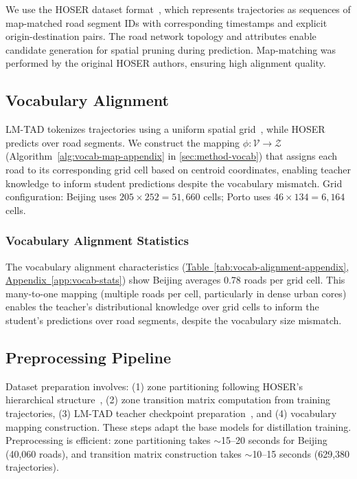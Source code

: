 We use the HOSER dataset format~\cite{caoHolisticSemanticRepresentation2025}, which represents trajectories as sequences of map-matched road segment IDs with corresponding timestamps and explicit origin-destination pairs. The road network topology and attributes enable candidate generation for spatial pruning during prediction. Map-matching was performed by the original HOSER authors, ensuring high alignment quality.

\subsection{Vocabulary Alignment}
\label{sec:data-lmtad-compat}

LM-TAD tokenizes trajectories using a uniform spatial grid~\cite{mbuyaTrajectoryAnomalyDetection2024}, while HOSER predicts over road segments. We construct the mapping $\phi: \mathcal{V} \rightarrow \mathcal{Z}$ (Algorithm~\ref{alg:vocab-map-appendix} in \autoref{sec:method-vocab}) that assigns each road to its corresponding grid cell based on centroid coordinates, enabling teacher knowledge to inform student predictions despite the vocabulary mismatch. Grid configuration: Beijing uses $205 \times 252 = 51{,}660$ cells; Porto uses $46 \times 134 = 6{,}164$ cells.

\subsubsection{Vocabulary Alignment Statistics}

The vocabulary alignment characteristics (\hyperref[app:vocab-stats]{Table~\ref*{tab:vocab-alignment-appendix}, Appendix~\ref*{app:vocab-stats}}) show Beijing averages 0.78 roads per grid cell. This many-to-one mapping (multiple roads per cell, particularly in dense urban cores) enables the teacher's distributional knowledge over grid cells to inform the student's predictions over road segments, despite the vocabulary size mismatch.

\subsection{Preprocessing Pipeline}
\label{sec:data-pipeline}

Dataset preparation involves: (1) zone partitioning following HOSER's hierarchical structure~\cite{caoHolisticSemanticRepresentation2025}, (2) zone transition matrix computation from training trajectories, (3) LM-TAD teacher checkpoint preparation~\cite{mbuyaTrajectoryAnomalyDetection2024}, and (4) vocabulary mapping construction. These steps adapt the base models for distillation training. Preprocessing is efficient: zone partitioning takes $\sim$15--20 seconds for Beijing (40,060 roads), and transition matrix construction takes $\sim$10--15 seconds (629,380 trajectories).

